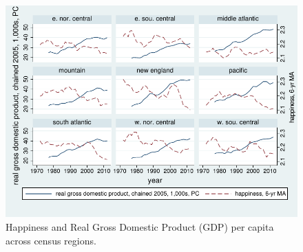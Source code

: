 \documentclass[10pt, letterpaper]{article}
\begin{document}
\begin{spacing}{1.5}
\begin{figure}[H]
 \includegraphics[width=7in]{GDP-SWB-INKSCAPE.pdf}\centering \caption{Happiness
   and Real Gross Domestic  Product (GDP) per capita  across  census regions.}\label{GDP-SWB} 
\end{figure}









% 





\end{spacing}
\end{document}
